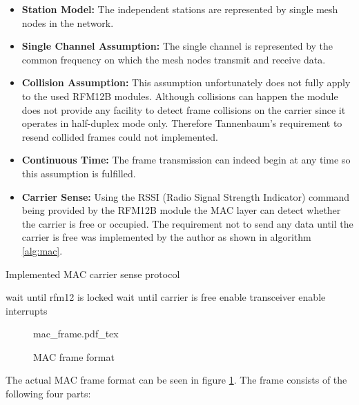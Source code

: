 \begin{itemize}
\item \textbf{Station Model:} The independent stations are represented by single mesh nodes in the network.
\item \textbf{Single Channel Assumption:} The single channel is represented by the common frequency on which the mesh nodes transmit and receive data.
\item \textbf{Collision Assumption:} This assumption unfortunately does not fully apply to the used RFM12B modules. Although collisions can happen the module does not provide any facility to detect frame collisions on the carrier since it operates in half-duplex mode only. Therefore Tannenbaum's requirement to resend collided frames could not implemented.
\item \textbf{Continuous Time:} The frame transmission can indeed begin at any time so this assumption is fulfilled.
\item \textbf{Carrier Sense:} Using the RSSI (Radio Signal Strength Indicator) command being provided by the RFM12B module the MAC layer can detect whether the carrier is free or occupied. The requirement not to send any data until the carrier is free was implemented by the author as shown in algorithm \ref{alg:mac}.
\end{itemize}

\begin{algorithm}[H]
\caption{Implemented MAC carrier sense protocol}
\label{alg:mac}
\begin{algorithmic}
\STATE wait until rfm12 is locked
    \STATE wait until carrier is free
\ENDIF
\STATE enable transceiver
\STATE enable interrupts
\end{algorithmic}
\end{algorithm}

\begin{figure}[H]
    \centering
    {mac_frame.pdf_tex}
    \caption{MAC frame format}
    \label{fig:mac}
\end{figure}

The actual MAC frame format can be seen in figure \ref{fig:mac}. The frame consists of the following four parts:

